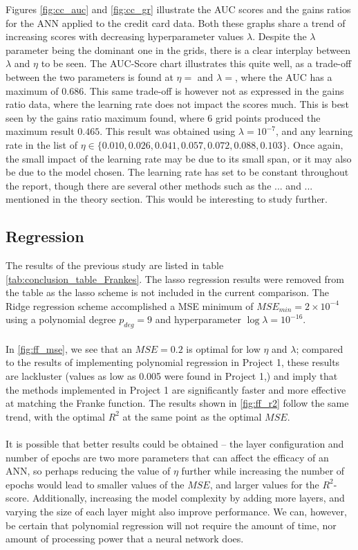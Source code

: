         Figures \ref{fig:cc_auc} and \ref{fig:cc_gr} illustrate the AUC scores and the gains ratios for the ANN applied to the credit card data. Both these graphs share a trend of increasing scores with decreasing hyperparameter values $\lambda$. Despite the $\lambda$ parameter being the dominant one in the grids, there is a clear interplay between $\lambda$ and $\eta$ to be seen. The AUC-Score chart illustrates this quite well, as a trade-off between the two parameters is found at $\eta=$ and $\lambda=$, where the AUC has a maximum of $0.686$. This same trade-off is however not as expressed in the gains ratio data, where the learning rate does not impact the scores much. This is best seen by the gains ratio maximum found, where 6 grid points produced the maximum result $0.465$. This result was obtained using $\lambda=10^{-7}$, and any learning rate in the list of $\eta \in \{ 0.010, 0.026, 0.041, 0.057, 0.072, 0.088, 0.103 \}$. Once again, the small impact of the learning rate may be due to its small span, or it may also be due to the model chosen. The learning rate has set to be constant throughout the report, though there are several other methods such as the ... and ... mentioned in the theory section. This would be interesting to study further.
            
    \subsection{Regression}
    	The results of the previous study are listed in table \ref{tab:conclusion_table_Frankes}. The lasso regression results were removed from the table as the lasso scheme is not included in the current comparison. The Ridge regression scheme accomplished a MSE minimum of $MSE_{min}= 2 \times 10^{-4}$ using a polynomial degree $p_{deg}=9$ and hyperparameter $\log\lambda=10^{-16}$. \\\\
		In \ref{fig:ff_mse}, we see that an $MSE = 0.2$ is optimal for low $\eta$ and $\lambda$; compared to the results of implementing polynomial regression in Project 1, these results are lackluster (values as low as 0.005 were found in Project 1,) and imply that the methods implemented in Project 1 are significantly faster and more effective at matching the Franke function.  The results shown in \ref{fig:ff_r2} follow the same trend, with the optimal $R^2$ at the same point as the optimal $MSE$. \\\\
		It is possible that better results could be obtained – the layer configuration and number of epochs are two more parameters that can affect the efficacy of an ANN, so perhaps reducing the value of $\eta$ further while increasing the number of epochs would lead to smaller values of the $MSE$, and larger values for the $R^2$-score.  Additionally, increasing the model complexity by adding more layers, and varying the size of each layer might also improve performance.  We can, however, be certain that polynomial regression will not require the amount of time, nor amount of processing power that a neural network does.
			
